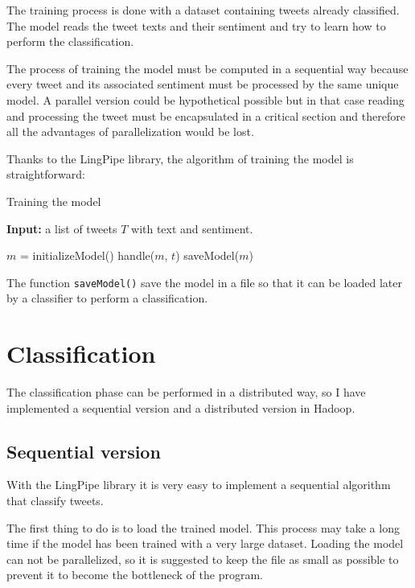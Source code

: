 \documentclass[10pt,twocolumn,letterpaper]{article}
\begin{document}
The training process is done with a dataset containing tweets already classified. The model reads the tweet texts and their sentiment and try to learn how to perform the classification.

The process of training the model must be computed in a sequential way because every tweet and its associated sentiment must be processed by the same unique model. A parallel version could be hypothetical possible but in that case reading and processing the tweet must be encapsulated in a critical section and therefore all the advantages of parallelization would be lost.

Thanks to the LingPipe library, the algorithm of training the model is straightforward:

\begin{algorithm}[H]
\caption{Training the model}
\textbf{Input:} a list of tweets $T$ with text and sentiment. \\
\begin{algorithmic}
    \State $m$ = initializeModel()
        \State handle($m$, $t$)
    \EndFor
    \State saveModel($m$)

\end{algorithmic}
\end{algorithm}

The function \verb"saveModel()" save the model in a file so that it can be loaded later by a classifier to perform a classification.

\section{Classification}

The classification phase can be performed in a distributed way, so I have implemented a sequential version and a distributed version in Hadoop.

\subsection{Sequential version}

With the LingPipe library it is very easy to implement a sequential algorithm that classify tweets.

The first thing to do is to load the trained model. This process may take a long time if the model has been trained with a very large dataset. Loading the model can not be parallelized, so it is suggested to keep the file as small as possible to prevent it to become the bottleneck of the program.
\end{document}
